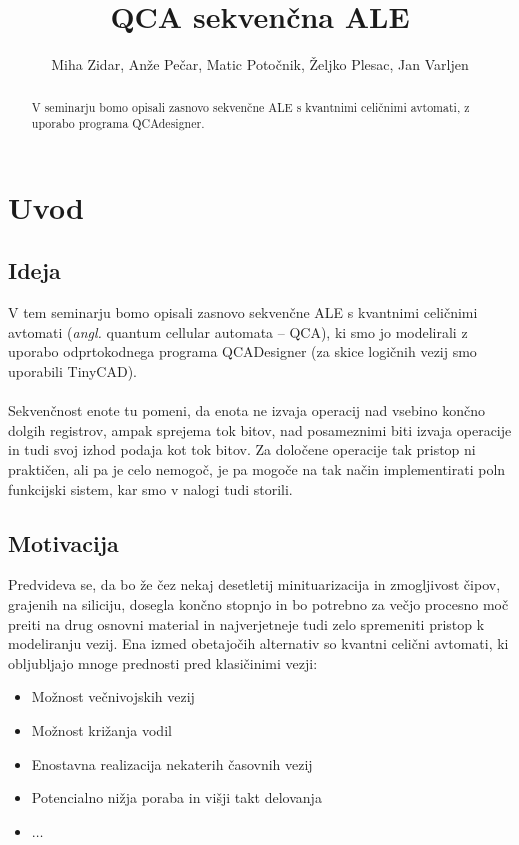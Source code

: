 \documentclass[seminar, slovene]{FRIreport}
\newcommand{\angl}[1]{(\textit{angl.} #1)}
\begin{document}
\title{QCA sekven\v cna ALE}

\author{Miha Zidar, Anže Pečar, Matic Potočnik, Željko Plesac, Jan Varljen}


\begin{abstract}
V seminarju bomo opisali zasnovo sekvenčne ALE s kvantnimi celičnimi avtomati, z uporabo programa QCAdesigner.

\end{abstract}

%
\section{Uvod}
\subsection{Ideja}
V tem seminarju bomo opisali zasnovo sekvenčne ALE s kvantnimi celičnimi avtomati \angl{quantum cellular automata -- QCA}, ki smo jo modelirali z uporabo odprtokodnega programa QCADesigner\cite{walus:2004} (za skice logičnih vezij smo uporabili TinyCAD). 
\ \\ \ \\
Sekvenčnost enote tu pomeni, da enota ne izvaja operacij nad vsebino končno dolgih registrov, ampak sprejema tok bitov, nad posameznimi biti izvaja operacije in tudi svoj izhod podaja kot tok bitov. Za določene operacije tak pristop ni praktičen, ali pa je celo nemogoč, je pa mogoče na tak način implementirati poln funkcijski sistem, kar smo v nalogi tudi storili. 

\subsection{Motivacija}
Predvideva se, da bo že čez nekaj desetletij minituarizacija in zmogljivost čipov, grajenih na siliciju, dosegla končno stopnjo in bo potrebno za večjo procesno moč preiti na drug osnovni material in najverjetneje tudi zelo spremeniti pristop k modeliranju vezij. Ena izmed obetajočih alternativ so kvantni celični avtomati, ki obljubljajo mnoge prednosti pred klasičinimi vezji:
\begin{itemize}
\item Možnost večnivojskih vezij
\item Možnost križanja vodil
\item Enostavna realizacija nekaterih časovnih vezij
\item Potencialno nižja poraba in višji takt delovanja
\item $\dots$
\end{itemize}
\end{document}
